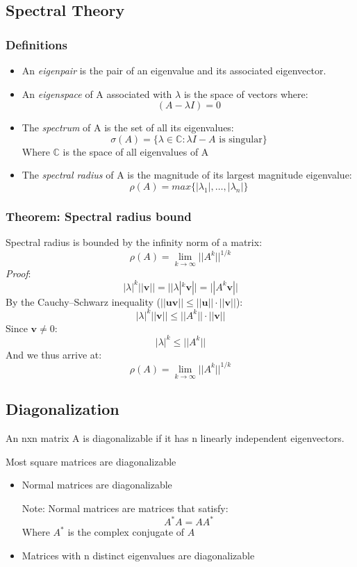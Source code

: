 \documentclass{article}
\begin{document}
\subsection{Spectral Theory}
\subsubsection{Definitions}
\begin{itemize}
\item An \textit{eigenpair} is the pair of an eigenvalue and its associated eigenvector.
\item An \textit{eigenspace} of A associated with $\lambda$ is the space of vectors where:
$$(A-\lambda I) = 0$$
\item The \textit{spectrum} of A is the set of all its eigenvalues:
$$\sigma(A)=\lbrace\lambda \in \mathbb{C}: \lambda I - A \textrm{ is singular}\rbrace$$
Where $\mathbb{C}$ is the space of all eigenvalues of A
\item The \textit{spectral radius} of A is the magnitude of its largest magnitude eigenvalue:
$$\rho(A)=max\lbrace |\lambda_1|, \ldots, |\lambda_n| \rbrace$$

\end{itemize}
\subsubsection{Theorem: Spectral radius bound} Spectral radius is bounded by the infinity norm of a matrix:
$$\rho(A)=\lim_{k\to\infty} ||A^k||^{1/k}$$
\textit{Proof}:
$$|\lambda|^k||\mathbf{v}||=||\lambda|^k\mathbf{v}||=||A^k\mathbf{v}||$$
By the Cauchy–Schwarz inequality ($||\mathbf{u}\mathbf{v}|| \leq ||\mathbf{u}||\cdot||\mathbf{v}||$):
$$|\lambda|^k||\mathbf{v}|| \leq ||A^k||\cdot||\mathbf{v}||$$
Since $\mathbf{v} \neq 0$:
$$|\lambda|^k \leq ||A^k||$$
And we thus arrive at:
$$\rho(A)=\lim_{k\to\infty} ||A^k||^{1/k}$$

\subsection{Diagonalization}
An nxn matrix A is diagonalizable if it has n linearly independent eigenvectors.

Most square matrices are diagonalizable
\begin{itemize}
\item Normal matrices are diagonalizable

Note: Normal matrices are matrices that satisfy:
$$A^* A=AA^*$$
Where $A^*$ is the complex conjugate of $A$
\item Matrices with n distinct eigenvalues are diagonalizable
\end{itemize}
\end{document}
